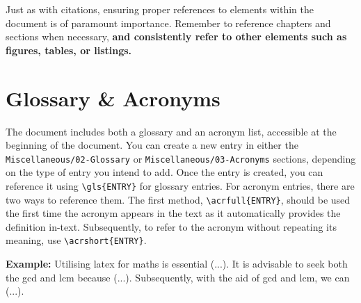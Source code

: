 \begin{importantbox}
Just as with citations, ensuring proper references to elements within the document is of paramount importance. Remember to reference chapters and sections when necessary, \textbf{and consistently refer to other elements such as figures, tables, or listings.}
\end{importantbox}

\section{Glossary \& Acronyms}
The document includes both a glossary and an acronym list, accessible at the beginning of the document. You can create a new entry in either the \verb|Miscellaneous/02-Glossary| or \verb|Miscellaneous/03-Acronyms| sections, depending on the type of entry you intend to add. Once the entry is created, you can reference it using \verb|\gls{ENTRY}| for glossary entries. For acronym entries, there are two ways to reference them. The first method, \verb|\acrfull{ENTRY}|, should be used the first time the acronym appears in the text as it automatically provides the definition in-text. Subsequently, to refer to the acronym without repeating its meaning, use \verb|\acrshort{ENTRY}|.

\vspace{.3cm}\noindent\textbf{Example:} Utilising \Gls{latex} for \Gls{maths} is essential (...). It is advisable to seek both the \acrfull{gcd} and \acrfull{lcm} because (...). Subsequently, with the aid of \acrshort{gcd} and \acrshort{lcm}, we can (...).